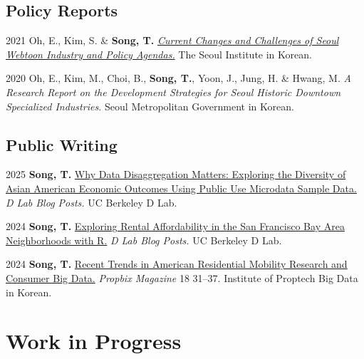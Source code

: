 \documentclass[10pt,letterpaper]{article}
\begin{document}
\subsection{Policy Reports}
\begin{tablist}
  \item[2021] \tab{}Oh, E., Kim, S. \& \textbf{Song, T.} \emph{\href{https://www.si.re.kr/bbs/view.do?key=2024100039&pstSn=2111190001}{Current Changes and Challenges of Seoul Webtoon Industry and Policy Agendas.}} The Seoul Institute in Korean.
  \item[2020] \tab{}Oh, E., Kim, M., Choi, B., \textbf{Song, T.}, Yoon, J., Jung, H. \& Hwang, M. \emph{A Research Report on the Development Strategies for Seoul Historic Downtown Specialized Industries.} Seoul Metropolitan Government in Korean.
\end{tablist}

\subsection{Public Writing}
\begin{tablist}
  \item[2025] \tab{}\textbf{Song, T.} \href{https://medium.com/@dlab-berkeley/why-data-disaggregation-matters-exploring-the-diversity-of-asian-american-economic-outcomes-using-8b96e5dcc9a4}{Why Data Disaggregation Matters: Exploring the Diversity of Asian American Economic Outcomes Using Public Use Microdata Sample Data.} \emph{D Lab Blog Posts.} UC Berkeley D Lab.
  \item[2024] \tab{}\textbf{Song, T.} \href{https://medium.com/@dlab-berkeley/exploring-rental-affordability-in-the-san-francisco-bay-area-neighborhoods-with-r-c4383f7553e7}{Exploring Rental Affordability in the San Francisco Bay Area Neighborhoods with R.} \emph{D Lab Blog Posts.} UC Berkeley D Lab.
  \item[2024] \tab{}\textbf{Song, T.} \href{https://www.kahps.org/data/prbx/pdf_44_7}{Recent Trends in American Residential Mobility Research and Consumer Big Data.} \emph{Propbix Magazine} 18 31–37. Institute of Proptech Big Data in Korean.
\end{tablist}

\section{Work in Progress}
\end{document}
